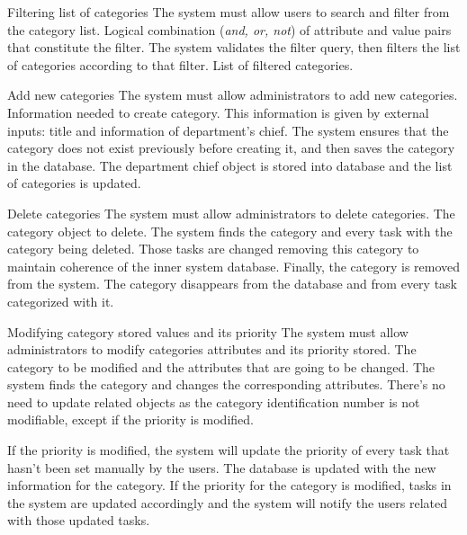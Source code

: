 \begin{requirement}{Filtering list of categories}
\reqdesc The system must allow users to search and filter from the category list.
\reqin Logical combination (\textit{and, or, not}) of attribute and value pairs that constitute the filter.
\reqsteps The system validates the filter query, then filters the list of categories according to that filter.
\reqout List of filtered categories.
\end{requirement}

\begin{requirement}{Add new categories}
\reqdesc The system must allow administrators to add new categories.
\reqin Information needed to create category. This information is given by external inputs: title and information of department's chief.
\reqsteps The system ensures that the category does not exist previously before creating it, and then saves the category in the database.
\reqout The department chief object is stored into database and the list of categories is updated.
\end{requirement}

\begin{requirement}{Delete categories}
\reqdesc The system must allow administrators to delete categories.
\reqin The category object to delete.
\reqsteps The system finds the category and every task with the category being deleted. Those tasks are changed removing this category to maintain coherence of the inner system database. Finally, the category is removed from the system.
\reqout The category disappears from the database and from every task categorized with it.
\end{requirement}

\begin{requirement}{Modifying category stored values and its priority}
\reqdesc The system must allow administrators to modify categories attributes and its priority stored.
\reqin The category to be modified and the attributes that are going to be changed.
\reqsteps The system finds the category and changes the corresponding attributes. There's no need to update related objects as the category identification number is not modifiable, except if the priority is modified.

If the priority is modified, the system will update the priority of every task that hasn't been set manually by the users.
\reqout The database is updated with the new information for the category. If the priority for the category is modified, tasks in the system are updated accordingly and the system will notify the users related with those updated tasks.
\end{requirement}


